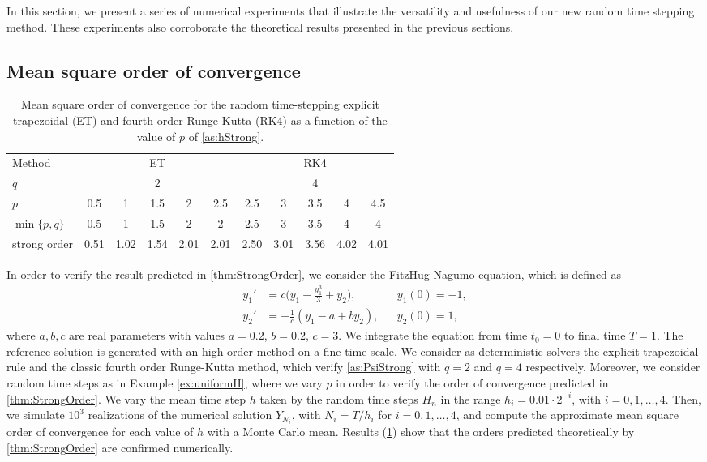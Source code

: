 \documentclass[10pt]{article}
\begin{document}
In this section, we present a series of numerical experiments that illustrate the versatility and usefulness of our new random time stepping method. These experiments also corroborate the theoretical results presented in the previous sections.

\subsection{Mean square order of convergence}

\begin{table}[!t]
	\centering
	\begin{tabular}{l|ccccc|ccccc}
		\toprule
		Method & \multicolumn{5}{c|}{ET} & \multicolumn{5}{c}{RK4} \\ 
		\cmidrule(l{2pt}r{2pt}){2-6} \cmidrule(l{2pt}r{2pt}){7-11} 
		$q$ & \multicolumn{5}{c|}{2} & \multicolumn{5}{c}{4} \\
		$p$ & 0.5 & 1 & 1.5 & 2 & 2.5 & 2.5 & 3 & 3.5 & 4 & 4.5\\
		$\min\{p,q\}$ & 0.5 & 1 & 1.5 & 2 & 2 & 2.5 & 3 & 3.5 & 4 & 4 \\
		strong order & 0.51 & 1.02 & 1.54 & 2.01 & 2.01 & 2.50 & 3.01 & 3.56 & 4.02 & 4.01 \\
		\bottomrule
	\end{tabular}
	\caption{Mean square order of convergence for the random time-stepping explicit trapezoidal (ET) and fourth-order Runge-Kutta (RK4) as a function of the value of $p$ of \cref{as:hStrong}.}
	\label{tab:NumericalResultsStrongOrder}
\end{table}

In order to verify the result predicted in \cref{thm:StrongOrder}, we consider the FitzHug-Nagumo equation, which is defined as
\begin{equation}\label{eq:FitzNag}
\begin{aligned}
y_1' &= c\big(y_1 - \frac{y_1^3}{3} + y_2\big), && y_1(0) = -1, \\
y_2' &= -\frac{1}{c}(y_1 - a + by_2), && y_2(0) = 1,
\end{aligned}
\end{equation}
where $a, b, c$ are real parameters with values $a = 0.2$, $b = 0.2$, $c = 3$. We integrate the equation from time $t_0 = 0$ to final time $T = 1$. The reference solution is generated with an high order method on a fine time scale. We consider as deterministic solvers the explicit trapezoidal rule and the classic fourth order Runge-Kutta method, which verify \cref{as:PsiStrong} with $q = 2$ and $q = 4$ respectively. Moreover, we consider random time steps as in Example \ref{ex:uniformH}, where we vary $p$ in order to verify the order of convergence predicted in \cref{thm:StrongOrder}. We vary the mean time step $h$ taken by the random time steps $H_n$ in the range $h_i = 0.01\cdot 2^{-i}$, with $i = 0, 1, \ldots, 4$. Then, we simulate $10^3$ realizations of the numerical solution $Y_{N_i}$, with $N_i = T / h_i$ for $i = 0, 1, \ldots, 4$, and compute the approximate mean square order of convergence for each value of $h$ with a Monte Carlo mean. Results (\cref{tab:NumericalResultsStrongOrder}) show that the orders predicted theoretically by \cref{thm:StrongOrder} are confirmed numerically. 
\end{document}
